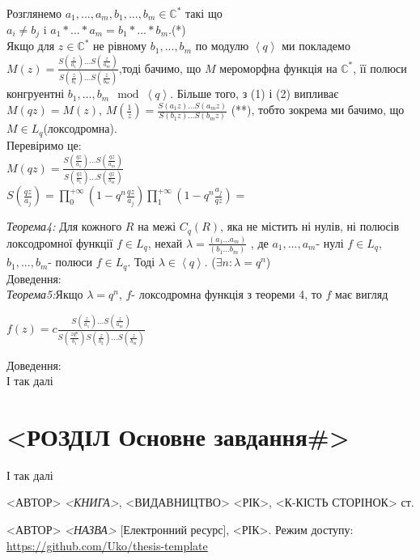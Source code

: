 \documentclass[12pt,a4paper]{article}
\begin{document}
Розглянемо $a_{1},...,a_{m},b_{1},...,b_{m}\in \mathbb{C}^{*}$ такі що\\
 $a_{i}\neq b_{j}$ i $a_{1}*...*a_{m}=b_{1}*...*b_{m}$.(*)\\

Якщо для $z \in \mathbb{C}^{*}$ не рівному $b_{1},...,b_{m}$ по модулю $\left \langle q \right \rangle $ ми покладемо $M(z)=\frac{S(\frac{z}{a_{1}})...S(\frac{z}{a_{m}})}{S(\frac{z}{b_{1}})...S(\frac{z}{b_{m}})}$,тоді бачимо, що $M$ мероморфна функція на $\mathbb{C}^{*}$, її полюси конгруентні $b_{1},...,b_{m}\mod \left \langle q \right \rangle $. Більше того, з (1) і (2) випливає $M(qz)=M(z)$, $M(\frac{1}{z})=\frac{S(a_{1}z)...S(a_{m}z)}{S(b_{1}z)...S(b_{m}z)}$ (**), тобто зокрема ми бачимо, що $M\in L_{q}$(локсодромна).\\
Перевіримо це:\\
$M(qz)=\frac{S(\frac{qz}{a_{1}})...S(\frac{qz}{a_{m}})}{S(\frac{qz}{b_{1}})...S(\frac{qz}{b_{m}})}$\\
$S(\frac{qz}{a_{j}})= \prod_{0}^{+\infty } ( 1-q^{n}\frac{qz}{a_{j}} ) \prod_{1}^{+\infty }( 1-q^{n}\frac{a_{j}}{qz})=$

\emph{Теорема4:} Для кожного $R$ на межі $C_{q}(R)$, яка не містить ні нулів, ні полюсів локсодромної функції $f\in L_{q}$, нехай $\lambda=\frac{(a_{1}...a_{m})}{(b_{1}...b_{m})}$ , де $a_{1},...,a_{m}$- нулі $f\in L_{q}$, $b_{1},...,b_{m}$- полюси $f\in L_{q}$. Тоді $\lambda\in \left \langle q \right \rangle$. ($ \exists n:\lambda =q^{n}$)\\
Доведення:
\\

\emph{Теорема5:}Якщо $\lambda =q^{n}$, $f$- локсодромна функція з теореми 4, то  $f$ має вигляд\\
 \begin{center}
 $f(z)= c\tfrac{S(\frac{z}{a_{1}})...S(\frac{z}{a_{m}})}{S(\frac{zq^{n}}{b_{1}})S(\frac{z}{b_{2}})...S(\frac{z}{b_{m}})}$
 \end{center}
Доведення:\\


І так далі\cite{web}

\clearpage
\section{<РОЗДІЛ Основне завдання\#>}



І так далі\cite{web}

\clearpage
{}
\begin{thebibliography}{9}

  <АВТОР> \emph{<КНИГА>},
    <ВИДАВНИЦТВО> <РІК>, <К-КІСТЬ СТОРІНОК> ст.
    
  <АВТОР> \emph{<НАЗВА>} [Електронний ресурс],
    <РІК>. Режим доступу:
    \url{https://github.com/Uko/thesis-template}

\end{thebibliography}
\end{document}
